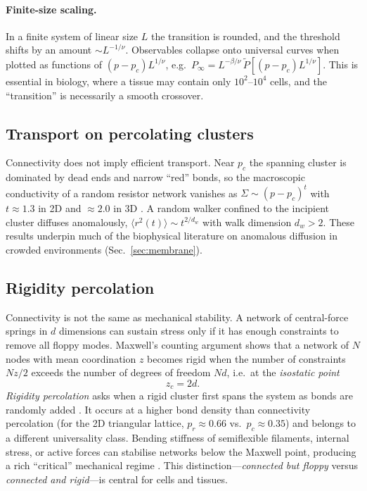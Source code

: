 \documentclass[11pt]{article}
\begin{document}
\paragraph{Finite-size scaling.} In a finite system of linear size $L$ the transition is rounded, and the threshold shifts by an amount $\sim L^{-1/\nu}$. Observables collapse onto universal curves when plotted as functions of $(p-p_c)L^{1/\nu}$, e.g.\ $P_\infty=L^{-\beta/\nu}\,\tilde{P}\!\left[(p-p_c)L^{1/\nu}\right]$. This is essential in biology, where a tissue may contain only $10^2$--$10^4$ cells, and the ``transition'' is necessarily a smooth crossover.

\subsection{Transport on percolating clusters}

Connectivity does not imply efficient transport. Near $p_c$ the spanning cluster is dominated by dead ends and narrow ``red'' bonds, so the macroscopic conductivity of a random resistor network vanishes as $\Sigma\sim(p-p_c)^{t}$ with $t\approx1.3$ in 2D and $\approx2.0$ in 3D \cite{StaufferAharony}. A random walker confined to the incipient cluster diffuses anomalously, $\langle r^2(t)\rangle\sim t^{2/d_w}$ with walk dimension $d_w>2$. These results underpin much of the biophysical literature on anomalous diffusion in crowded environments (Sec.~\ref{sec:membrane}).

\subsection{Rigidity percolation}

Connectivity is not the same as mechanical stability. A network of central-force springs in $d$ dimensions can sustain stress only if it has enough constraints to remove all floppy modes. Maxwell's counting argument shows that a network of $N$ nodes with mean coordination $z$ becomes rigid when the number of constraints $Nz/2$ exceeds the number of degrees of freedom $Nd$, i.e.\ at the \emph{isostatic point}
\begin{equation}
z_c=2d .
\label{eq:maxwell}
\end{equation}
\emph{Rigidity percolation} asks when a rigid cluster first spans the system as bonds are randomly added \cite{FengSen1984,JacobsThorpe1995}. It occurs at a higher bond density than connectivity percolation (for the 2D triangular lattice, $p_r\approx0.66$ vs.\ $p_c\approx0.35$) and belongs to a different universality class. Bending stiffness of semiflexible filaments, internal stress, or active forces can stabilise networks below the Maxwell point, producing a rich ``critical'' mechanical regime \cite{Broedersz2011,Sharma2016}. This distinction---\emph{connected but floppy} versus \emph{connected and rigid}---is central for cells and tissues.
\end{document}
